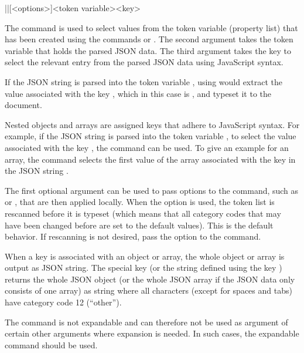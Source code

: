 \documentclass[a4paper]{article}
\begin{document}
{{\begin{macrodef}
|\JSONParseValue|[<options>]{<token variable>}{<key>}
\end{macrodef}
The command \macro{\JSONParseValue} is used to select values from the token variable (property list) that has been created using the commands \macro{\JSONParse} or \macro{\JSONParseFromFile}. The second argument takes the token variable that holds the parsed JSON data. The third argument takes the key to select the relevant entry from the parsed JSON data using JavaScript syntax.

If the JSON string  is parsed into the token variable \macro{\myJSONdata}, using  would extract the value associated with the key , which in this case is , and typeset it to the document.

Nested objects and arrays are assigned keys that adhere to JavaScript syntax. For example, if the JSON string  is parsed into the token variable \macro{\myJSONdata}, to select the value associated with the key , the command  can be used. To give an example for an array, the command  selects the first value of the array associated with the key  in the JSON string .

The first optional argument can be used to pass options to the command, such as  or , that are then applied locally. When the option  is used, the token list is rescanned before it is typeset (which means that all category codes that may have been changed before are set to the default values). This is the default behavior. If rescanning is not desired, pass the option  to the command.

When a key is associated with an object or array, the whole object or array is output as JSON string. The special key  (or the string defined using the key ) returns the whole JSON object (or the whole JSON array if the JSON data only consists of one array) as string where all characters (except for spaces and tabs) have category code 12 (``other'').

The command \macro{\JSONParseValue} is not expandable and can therefore not be used as argument of certain other arguments where expansion is needed. In such cases, the expandable command \macro{\JSONParseExpandableValue} should be used.

}}
\end{document}
